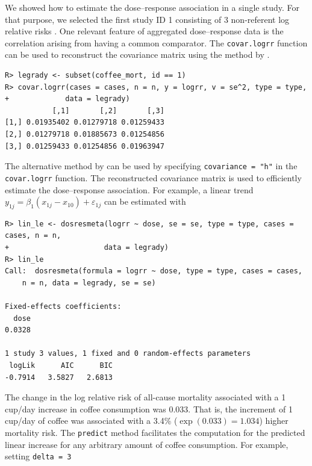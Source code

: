 \documentclass[11pt,a4paper,twoside,openany]{book}\usepackage{knitr}
\begin{document}
{{\noindent We showed how to estimate the dose--response association in a single study. For that purpose, we selected the first study ID 1 consisting of 3 non-referent log relative risks \citep{legrady1987coffee}. One relevant feature of aggregated dose--response data is the correlation arising from having a common comparator. The \texttt{covar.logrr} function can be used to reconstruct the covariance matrix using the method by \cite{greenland1992methods}.

\begin{knitrout}\footnotesize
{}\color{fgcolor}\begin{kframe}
\begin{verbatim}
R> legrady <- subset(coffee_mort, id == 1)
R> covar.logrr(cases = cases, n = n, y = logrr, v = se^2, type = type, 
+             data = legrady)
           [,1]       [,2]       [,3]
[1,] 0.01935402 0.01279718 0.01259433
[2,] 0.01279718 0.01885673 0.01254856
[3,] 0.01259433 0.01254856 0.01963947
\end{verbatim}
\end{kframe}
\end{knitrout}

\noindent The alternative method by \cite{hamling2008facilitating} can be used by specifying \texttt{covariance = "h"} in the \texttt{covar.logrr} function. The reconstructed covariance matrix is used to efficiently estimate the dose--response association. For example, a linear trend $y_{1j} = \beta_1 (x_{1j} - x_{10}) + \varepsilon_{1j}$ can be estimated with

\begin{knitrout}\footnotesize
{}\color{fgcolor}\begin{kframe}
\begin{verbatim}
R> lin_le <- dosresmeta(logrr ~ dose, se = se, type = type, cases = cases, n = n, 
+                      data = legrady)
R> lin_le
Call:  dosresmeta(formula = logrr ~ dose, type = type, cases = cases, 
    n = n, data = legrady, se = se)

Fixed-effects coefficients:
  dose  
0.0328  

1 study 3 values, 1 fixed and 0 random-effects parameters
 logLik      AIC      BIC  
-0.7914   3.5827   2.6813  
\end{verbatim}
\end{kframe}
\end{knitrout}


\noindent The change in the log relative risk of all-cause mortality associated with a 1 cup/day increase in coffee consumption was 0.033. That is, the increment of 1 cup/day of coffee was associated with a 3.4\%
($\exp(0.033) = 1.034$) higher mortality risk. 
The \texttt{predict} method facilitates the computation for the predicted linear increase for any arbitrary amount of coffee consumption. For example, setting \texttt{delta = 3}

}}
\end{document}
